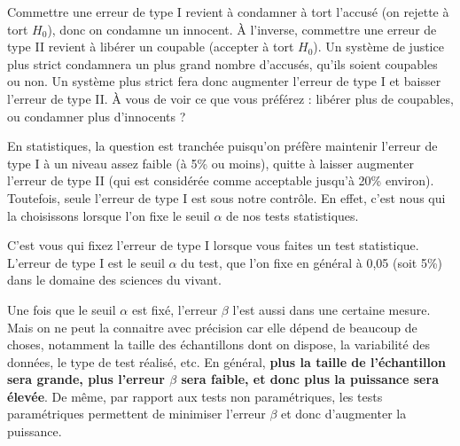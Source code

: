 \documentclass[
  a4paper,
  DIV=11,
  numbers=noendperiod,
  oneside]{scrreprt}
\begin{document}
Commettre une erreur de type I revient à condamner à tort l'accusé (on
rejette à tort \(H_0\)), donc on condamne un innocent. À l'inverse,
commettre une erreur de type II revient à libérer un coupable (accepter
à tort \(H_0\)). Un système de justice plus strict condamnera un plus
grand nombre d'accusés, qu'ils soient coupables ou non. Un système plus
strict fera donc augmenter l'erreur de type I et baisser l'erreur de
type II. À vous de voir ce que vous préférez : libérer plus de
coupables, ou condamner plus d'innocents ?

En statistiques, la question est tranchée puisqu'on préfère maintenir
l'erreur de type I à un niveau assez faible (à 5\% ou moins), quitte à
laisser augmenter l'erreur de type II (qui est considérée comme
acceptable jusqu'à 20\% environ). Toutefois, seule l'erreur de type I
est sous notre contrôle. En effet, c'est nous qui la choisissons lorsque
l'on fixe le seuil \(\alpha\) de nos tests statistiques.

\begin{tcolorbox}[enhanced jigsaw, breakable, toprule=.15mm, colbacktitle=quarto-callout-important-color!10!white, colframe=quarto-callout-important-color-frame, arc=.35mm, bottomtitle=1mm, opacityback=0, title=\textcolor{quarto-callout-important-color}{\faExclamation}\hspace{0.5em}{À retenir}, bottomrule=.15mm, colback=white, toptitle=1mm, rightrule=.15mm, leftrule=.75mm, opacitybacktitle=0.6, left=2mm, titlerule=0mm, coltitle=black]

C'est vous qui fixez l'erreur de type I lorsque vous faites un test
statistique. L'erreur de type I est le seuil \(\alpha\) du test, que
l'on fixe en général à 0,05 (soit 5\%) dans le domaine des sciences du
vivant.

\end{tcolorbox}

Une fois que le seuil \(\alpha\) est fixé, l'erreur \(\beta\) l'est
aussi dans une certaine mesure. Mais on ne peut la connaitre avec
précision car elle dépend de beaucoup de choses, notamment la taille des
échantillons dont on dispose, la variabilité des données, le type de
test réalisé, etc. En général, \textbf{plus la taille de l'échantillon
sera grande, plus l'erreur \(\beta\) sera faible, et donc plus la
puissance sera élevée}. De même, par rapport aux tests non
paramétriques, les tests paramétriques permettent de minimiser l'erreur
\(\beta\) et donc d'augmenter la puissance.
\end{document}
